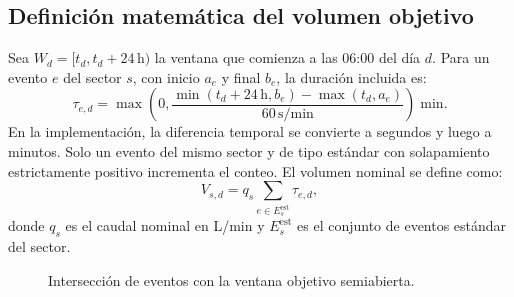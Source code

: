 \documentclass[11pt,letterpaper]{article}
\begin{document}
\subsection{Definición matemática del volumen objetivo}
Sea $W_d=[t_d,t_d+24\,\mathrm{h})$ la ventana que comienza a las 06:00 del día $d$. Para un evento $e$ del sector $s$, con inicio $a_e$ y final $b_e$, la duración incluida es:
\begin{equation}
  \tau_{e,d}=\max\left(0,\frac{\min(t_d+24\,\mathrm{h},b_e)-\max(t_d,a_e)}{60\,\mathrm{s/min}}\right)\;\mathrm{min}.
  \label{eq:solapamiento}
\end{equation}
En la implementación, la diferencia temporal se convierte a segundos y luego a minutos. Solo un evento del mismo sector y de tipo estándar con solapamiento estrictamente positivo incrementa el conteo. El volumen nominal se define como:
\begin{equation}
  V_{s,d}=q_s\sum_{e\in E_s^{\mathrm{est}}}\tau_{e,d},
  \label{eq:target}
\end{equation}
donde $q_s$ es el caudal nominal en L/min y $E_s^{\mathrm{est}}$ es el conjunto de eventos estándar del sector.

\begin{figure}[H]
\centering
{}
\caption{Intersección de eventos con la ventana objetivo semiabierta.}\label{fig:ventana}
\end{figure}
\end{document}
